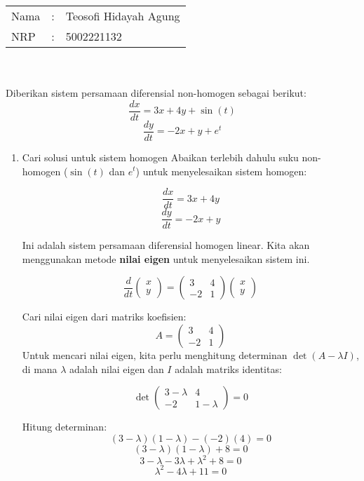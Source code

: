 \documentclass{article}
\begin{document}
\setlength{\parindent}{0pt}
    \noindent
    \begin{tabular}{|lcl|}
     \hline
     Nama&:&Teosofi Hidayah Agung\\
     NRP&:&5002221132\\
     \hline
    \end{tabular}\\~\\
    Diberikan sistem persamaan diferensial non-homogen sebagai berikut:
\[
\frac{dx}{dt} = 3x + 4y + \sin(t)
\]
\[
\frac{dy}{dt} = -2x + y + e^t
\]
\begin{enumerate}[label=(\arabic*)]
    \item Cari solusi untuk sistem homogen
    Abaikan terlebih dahulu suku non-homogen (\(\sin(t)\) dan \(e^t\)) untuk menyelesaikan sistem homogen:
    
    \[
    \frac{dx}{dt} = 3x + 4y
    \]
    \[
    \frac{dy}{dt} = -2x + y
    \]
    
    Ini adalah sistem persamaan diferensial homogen linear. Kita akan menggunakan metode \textbf{nilai eigen} untuk menyelesaikan sistem ini.

    \[
    \frac{d}{dt} \begin{pmatrix} x \\ y \end{pmatrix} = \begin{pmatrix} 3 & 4 \\ -2 & 1 \end{pmatrix} \begin{pmatrix} x \\ y \end{pmatrix}
    \]
    
    Cari nilai eigen dari matriks koefisien:
    \[
    A = \begin{pmatrix} 3 & 4 \\ -2 & 1 \end{pmatrix}
    \]
    Untuk mencari nilai eigen, kita perlu menghitung determinan \(\det(A - \lambda I)\), di mana \(\lambda\) adalah nilai eigen dan \(I\) adalah matriks identitas:
    
    \[
    \det \begin{pmatrix} 3 - \lambda & 4 \\ -2 & 1 - \lambda \end{pmatrix} = 0
    \]
    
    Hitung determinan:
    \[
    (3 - \lambda)(1 - \lambda) - (-2)(4) = 0
    \]
    \[
    (3 - \lambda)(1 - \lambda) + 8 = 0
    \]
    \[
    3 - \lambda - 3\lambda + \lambda^2 + 8 = 0
    \]
    \[
    \lambda^2 - 4\lambda + 11 = 0
    \]
    

\end{enumerate}
\end{document}
